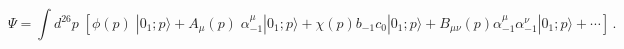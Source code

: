 \begin{equation}
\Psi =
\int d^{26}p \;
\left[ \phi (p)\; | 0_1; p \rangle + A_\mu (p) \; \alpha^\mu_{-1} | 0_1; p
\rangle + \chi ( p) b_{-1} c_0| 0_1; p \rangle + B_{\mu \nu} ( p)
\alpha^\mu_{-1} \alpha^\nu_{-1} | 0_1; p \rangle + \cdots
\right]\,.
 \label{eq:field-expansion-2}
\end{equation}

